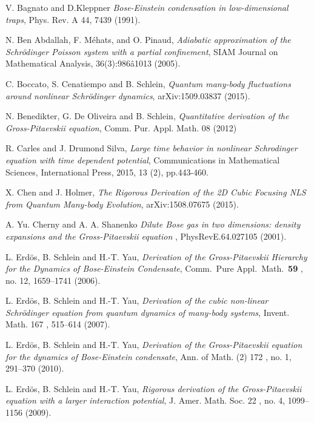 \documentclass[11pt, english, american]{article}
\begin{document}
\begin{thebibliography}{}

V.  Bagnato and D.Kleppner
\emph{Bose-Einstein condensation in low-dimensional traps},
Phys. Rev. A 44, 7439 (1991).


N. Ben Abdallah, F. M\'ehats, and O. Pinaud,
\emph{
  Adiabatic
approximation of
the Schr\"odinger Poisson system with a partial confinement},
SIAM Journal on
Mathematical Analysis, 36(3):986â1013 (2005).




C. Boccato, S. Cenatiempo and B. Schlein,
\emph{Quantum many-body fluctuations around nonlinear Schr\"odinger dynamics},
arXiv:1509.03837 (2015).


  N. Benedikter, G. De Oliveira and B. Schlein, \emph{Quantitative derivation of the Gross-Pitaevskii equation}, Comm. Pur. Appl. Math.  08 (2012)

R. Carles and J. Drumond Silva,
\emph{
Large time behavior in nonlinear Schrodinger equation with time dependent potential}, Communications in Mathematical Sciences, International Press, 2015, 13 (2), pp.443-460.


X. Chen and J. Holmer, \emph{ The Rigorous Derivation of the 2D Cubic Focusing NLS from Quantum Many-body Evolution}, arXiv:1508.07675 (2015).


A. Yu. Cherny and A. A. Shanenko
\emph{Dilute Bose gas in two dimensions: density expansions and the Gross-Pitaevskii equation
}, PhysRevE.64.027105 (2001).


 L. Erd\"os, B. Schlein and  H.-T. Yau, \emph{Derivation of the Gross-Pitaevskii Hierarchy for the Dynamics
of Bose-Einstein Condensate}, Comm.\ Pure Appl.\ Math.\ \textbf{59}
, no. 12, 1659--1741 (2006).

 L. Erd\"os, B. Schlein and  H.-T. Yau, \emph{ Derivation of the cubic non-linear Schr\"odinger equation from
quantum dynamics of many-body systems}, Invent. Math. 167
, 515--614 (2007).


 L. Erd\"os, B. Schlein and  H.-T. Yau, \emph{ Derivation of the Gross-Pitaevskii  equation for the dynamics of Bose-Einstein condensate}, Ann. of Math. (2) 172
, no. 1, 291--370 (2010).



 L. Erd\"os, B. Schlein and  H.-T. Yau, \emph{Rigorous derivation of the Gross-Pitaevskii  equation with a larger interaction potential}, J. Amer. Math. Soc. 22
, no. 4, 1099--1156 (2009).



\end{thebibliography}
\end{document}
